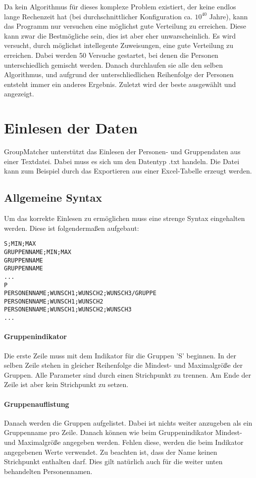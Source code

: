 \documentclass[a4paper,11pt]{article}
\begin{document}
Da kein Algorithmus für dieses komplexe Problem existiert, der keine endlos lange Rechenzeit hat (bei durchschnittlicher Konfiguration ca. $10^{40}$ Jahre), kann das Programm nur versuchen eine möglichst gute Verteilung zu erreichen. Diese kann zwar die Bestmögliche sein, dies ist aber eher unwarscheinlich. Es wird versucht, durch möglichst intellegente Zuweisungen, eine gute Verteilung zu erreichen. Dabei werden 50 Versuche gestartet, bei denen die Personen unterschiedlich gemischt werden. Danach durchlaufen sie alle den selben Algorithmus, und aufgrund der unterschliedlichen Reihenfolge der Personen entsteht immer ein anderes Ergebnis. Zuletzt wird der beste ausgewählt und angezeigt.

\section{Einlesen der Daten}
\label{sec:input-from-file}
GroupMatcher unterstützt das Einlesen der Personen- und Gruppendaten aus einer Textdatei. Dabei muss es sich um den Datentyp .txt handeln. Die Datei kann zum Beispiel durch das Exportieren aus einer Excel-Tabelle erzeugt werden.
\subsection{Allgemeine Syntax}
\label{ssec:input-syntax}
Um das korrekte Einlesen zu ermöglichen muss eine strenge Syntax eingehalten werden. Diese ist folgendermaßen aufgebaut:
\begin{lstlisting}
S;MIN;MAX
GRUPPENNAME;MIN;MAX
GRUPPENNAME
GRUPPENNAME
...
P
PERSONENNAME;WUNSCH1;WUNSCH2;WUNSCH3/GRUPPE
PERSONENNAME;WUNSCH1;WUNSCH2
PERSONENNAME;WUNSCH1;WUNSCH2;WUNSCH3
...
\end{lstlisting}
\paragraph{Gruppenindikator}
Die erste Zeile muss mit dem Indikator für die Gruppen 'S' beginnen.  In der selben Zeile stehen in gleicher Reihenfolge die Mindest- und Maximalgröße der Gruppen. Alle Parameter sind durch einen Strichpunkt zu trennen. Am Ende der Zeile ist aber kein Strichpunkt zu setzen.
\paragraph{Gruppenauflistung}
Danach werden die Gruppen aufgelistet. Dabei ist nichts weiter anzugeben als ein Gruppenname pro Zeile. Danach können wie beim Gruppenindikator Mindest- und Maximalgröße angegeben werden. Fehlen diese, werden die beim Indikator angegebenen Werte verwendet. Zu beachten ist, dass der Name keinen Strichpunkt enthalten darf. Dies gilt natürlich auch für die weiter unten behandelten Personennamen.
\end{document}
